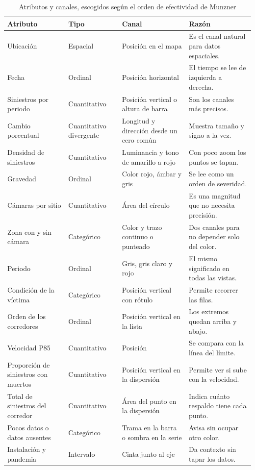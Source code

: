 \documentclass[10pt,a4paper]{article}
\begin{document}
\begin{table}[H]\centering\small
\begin{tabularx}{\linewidth}{P{3.7cm}P{2.3cm}P{4.4cm}L}
\toprule
\textbf{Atributo} & \textbf{Tipo} & \textbf{Canal} & \textbf{Razón}\\
\midrule
Ubicación & Espacial & Posición en el mapa & Es el canal natural para datos espaciales.\\
Fecha & Ordinal & Posición horizontal & El tiempo se lee de izquierda a derecha.\\
Siniestros por periodo & Cuantitativo & Posición vertical o altura de barra & Son los canales más precisos.\\
Cambio porcentual & Cuantitativo divergente & Longitud y dirección desde un cero común & Muestra tamaño y signo a la vez.\\
Densidad de siniestros & Cuantitativo & Luminancia y tono de amarillo a rojo & Con poco zoom los puntos se tapan.\\
Gravedad & Ordinal & Color rojo, ámbar y gris & Se lee como un orden de severidad.\\
Cámaras por sitio & Cuantitativo & Área del círculo & Es una magnitud que no necesita precisión.\\
Zona con y sin cámara & Categórico & Color y trazo continuo o punteado & Dos canales para no depender solo del color.\\
Periodo & Ordinal & Gris, gris claro y rojo & El mismo significado en todas las vistas.\\
Condición de la víctima & Categórico & Posición vertical con rótulo & Permite recorrer las filas.\\
Orden de los corredores & Ordinal & Posición vertical en la lista & Los extremos quedan arriba y abajo.\\
Velocidad P85 & Cuantitativo & Posición & Se compara con la línea del límite.\\
Proporción de siniestros con muertos & Cuantitativo & Posición vertical en la dispersión & Permite ver si sube con la velocidad.\\
Total de siniestros del corredor & Cuantitativo & Área del punto en la dispersión & Indica cuánto respaldo tiene cada punto.\\
Pocos datos o datos ausentes & Categórico & Trama en la barra o sombra en la serie & Avisa sin ocupar otro color.\\
Instalación y pandemia & Intervalo & Cinta junto al eje & Da contexto sin tapar los datos.\\
\bottomrule
\end{tabularx}
\caption{Atributos y canales, escogidos según el orden de efectividad de Munzner \cite{munzner}}
\end{table}
\end{document}
